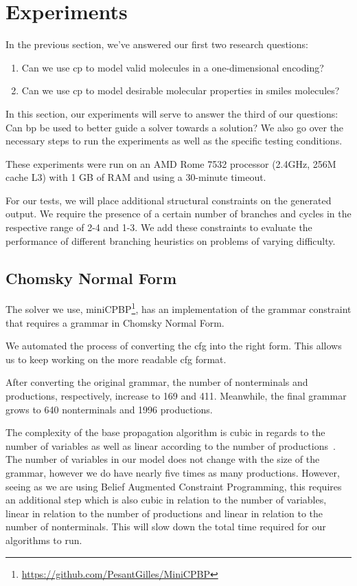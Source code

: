 \documentclass[../Document.tex]{subfiles}
\begin{document}
\section{Experiments}
In the previous section, we've answered our first two research questions:

\begin{enumerate}
    \item Can we use \gls{cp} to model valid molecules in a one-dimensional encoding?
    \item Can we use \gls{cp} to model desirable molecular properties in \gls{smiles} molecules?
\end{enumerate}

In this section, our experiments will serve to answer the third of our questions: Can \gls{bp} be used to better guide a solver towards a solution? We also go over the necessary steps to run the experiments as well as the specific testing conditions.

These experiments were run on an AMD Rome 7532 processor (2.4GHz, 256M cache L3) with 1 GB of RAM and using a 30-minute timeout.

For our tests, we will place additional structural constraints on the generated output. We require the presence of a certain number of branches and cycles in the respective range of 2-4 and 1-3. We add these constraints to evaluate the performance of different branching heuristics on problems of varying difficulty.

\subsection{Chomsky Normal Form}
The solver we use, miniCPBP\footnote{\url{https://github.com/PesantGilles/MiniCPBP}}, has an implementation of the grammar constraint that requires a grammar in Chomsky Normal Form.


We automated the process of converting the \gls{cfg} into the right form. This allows us to keep working on the more readable \gls{cfg} format.

After converting the original grammar, the number of nonterminals and productions, respectively, increase to 169 and 411. Meanwhile, the final grammar grows to 640 nonterminals and 1996 productions.

The complexity of the base propagation algorithm is cubic in regards to the number of variables as well as linear according to the number of productions~\cite{quimper2006}. The number of variables in our model does not change with the size of the grammar, however we do have nearly five times as many productions.
However, seeing as we are using Belief Augmented Constraint Programming, this requires an additional step which is also cubic in relation to the number of variables, linear in relation to the number of productions and linear in relation to the number of nonterminals.
This will slow down the total time required for our algorithms to run.
\end{document}
